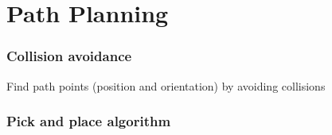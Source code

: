 \section{Path Planning}

\subsubsection{Collision avoidance} 
Find path points (position and orientation) by avoiding collisions
\subsubsection{Pick and place algorithm}
